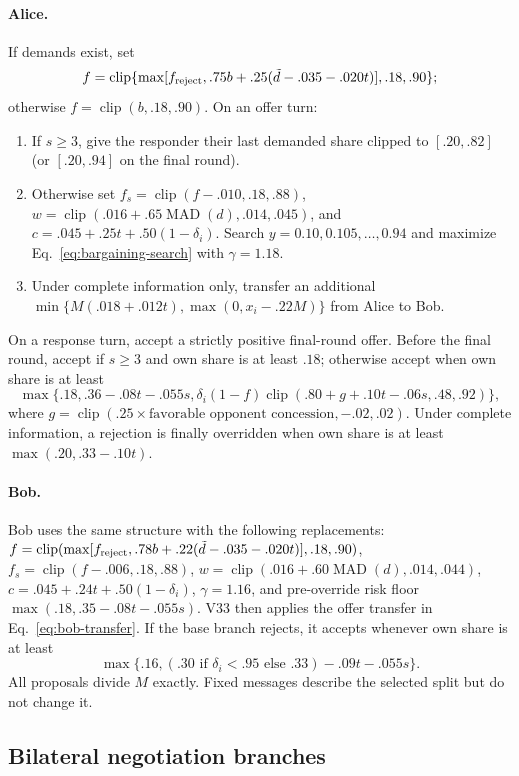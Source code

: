 \paragraph{Alice.}
If demands exist, set
\[
 f=\operatorname{clip}\{\max[f_{\rm reject},
 .75b+.25(\tilde d-.035-.020t)],.18,.90\};
\]
otherwise $f=\operatorname{clip}(b,.18,.90)$. On an offer turn:
\begin{enumerate}
 \item If $s\ge3$, give the responder their last demanded share clipped to
 $[.20,.82]$ (or $[.20,.94]$ on the final round).
 \item Otherwise set $f_s=\operatorname{clip}(f-.010,.18,.88)$,
 $w=\operatorname{clip}(.016+.65\operatorname{MAD}(d),.014,.045)$, and
 $c=.045+.25t+.50(1-\delta_i)$. Search
 $y=0.10,0.105,\ldots,0.94$ and maximize Eq.~\ref{eq:bargaining-search}
 with $\gamma=1.18$.
 \item Under complete information only, transfer an additional
 $\min\{M(.018+.012t),\max(0,x_i-.22M)\}$ from Alice to Bob.
\end{enumerate}
On a response turn, accept a strictly positive final-round offer. Before the
final round, accept if $s\ge3$ and own share is at least $.18$; otherwise accept
when own share is at least
\[
 \max\{.18,.36-.08t-.055s,
 \delta_i(1-f)\operatorname{clip}(.80+g+.10t-.06s,.48,.92)\},
\]
where $g=\operatorname{clip}(.25\times\text{favorable opponent concession},
-.02,.02)$. Under complete information, a rejection is finally overridden
when own share is at least $\max(.20,.33-.10t)$.

\paragraph{Bob.}
Bob uses the same structure with the following replacements:
$f=\operatorname{clip}(\max[f_{\rm reject},.78b+.22(\tilde d-.035-.020t)],.18,.90)$,
$f_s=\operatorname{clip}(f-.006,.18,.88)$,
$w=\operatorname{clip}(.016+.60\operatorname{MAD}(d),.014,.044)$,
$c=.045+.24t+.50(1-\delta_i)$, $\gamma=1.16$, and pre-override risk floor
$\max(.18,.35-.08t-.055s)$. V33 then applies the offer transfer in
Eq.~\ref{eq:bob-transfer}. If the base branch rejects, it accepts whenever own
share is at least
\[
 \max\{.16,(.30\text{ if }\delta_i<.95\text{ else }.33)-.09t-.055s\}.
\]
All proposals divide $M$ exactly. Fixed messages describe the selected split
but do not change it.

\subsection{Bilateral negotiation branches}

